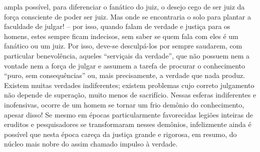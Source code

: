 ampla possível, para diferenciar o fanático do juiz, o desejo cego de
ser juiz da força consciente de poder ser juiz. Mas onde se encontraria
o solo para plantar a faculdade de julgar! -- por isso, quando falam de
verdade e justiça para os homens, estes sempre ficam indecisos, sem
saber se quem fala com eles é um fanático ou um juiz. Por isso, deve-se
desculpá-los por sempre saudarem, com particular benevolência, aqueles
``serviçais da verdade'', que não possuem nem a vontade nem a força de
julgar e assumem a tarefa de procurar o conhecimento ``puro, sem
consequências'' ou, mais precisamente, a verdade que nada produz.
Existem muitas verdades indiferentes; existem problemas cujo correto
julgamento não depende de superação, muito menos de sacrifício. Nessas
esferas indiferentes e inofensivas, ocorre de um homem se tornar um frio
demônio do conhecimento, apesar disso! Se mesmo em épocas
particularmente favorecidas legiões inteiras de eruditos e pesquisadores
se transformaram nesses demônios, infelizmente ainda é possível que
nesta época careça da justiça grande e rigorosa, em resumo, do núcleo
mais nobre do assim chamado impulso à verdade.

